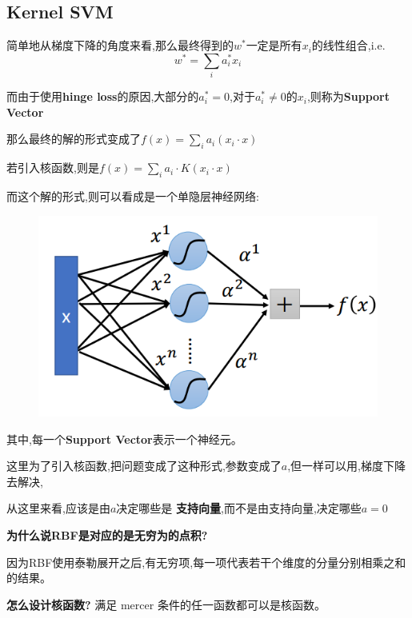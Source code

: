 \documentclass[UTF8,a4paper]{ctexart}
\begin{document}
        \subsection{Kernel SVM}
        简单地从梯度下降的角度来看,那么最终得到的$w^*$一定是所有$x_i$的线性组合,i.e.
        \begin{equation}
            w^* = \sum_i a_i^* x_i
        \end{equation}

        而由于使用\textbf{hinge loss}的原因,大部分的$a_i^* = 0$,对于$a_i^* \neq 0$的$x_i$,则称为\textbf{Support Vector}

        那么最终的解的形式变成了$f(x) = \sum_i a_i(x_i\cdot x)$

         若引入核函数,则是$f(x) = \sum_i a_i\cdot K(x_i\cdot x)$

        而这个解的形式,则可以看成是一个单隐层神经网络:

        \begin{figure}[H]
            \centering
            \includegraphics[scale = 0.3]{assets/ML_b1b86.png}
        \end{figure}

        其中,每一个\textbf{Support Vector}表示一个神经元。

        {\color{blue} 这里为了引入核函数,把问题变成了这种形式,参数变成了$a$,但一样可以用,梯度下降去解决,

        从这里来看,应该是由$a$决定哪些是 \textbf{支持向量},而不是由支持向量,决定哪些$a = 0$}

        \textbf{为什么说RBF是对应的是无穷为的点积?}

        因为RBF使用泰勒展开之后,有无穷项,每一项代表若干个维度的分量分别相乘之和的结果。

        \textbf{怎么设计核函数?}
        满足 mercer 条件的任一函数都可以是核函数。
\end{document}
